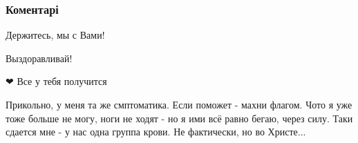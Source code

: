  
 
 
 
 
\subsubsection{Коментарі}

\begin{itemize}

 
Держитесь, мы с Вами!

 
Выздоравливай!

 
❤ Все у тебя получится

 
Прикольно, у меня та же смптоматика. Если поможет - махни флагом. Чото я уже тоже больше не могу, ноги не ходят - но я ими всё равно бегаю, через силу. Таки сдается мне - у нас одна группа крови. Не фактически, но во Христе...

 

\end{itemize}
